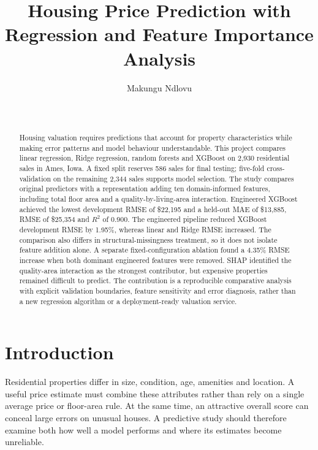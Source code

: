 \documentclass{sigkddExp}
\begin{document}
\title{Housing Price Prediction with Regression and Feature Importance Analysis}
\author{\alignauthor Makungu Ndlovu\\
\\
\\
}
\maketitle
\begin{abstract}
Housing valuation requires predictions that account for property characteristics while making error patterns and model behaviour understandable. This project compares linear regression, Ridge regression, random forests and XGBoost on 2,930 residential sales in Ames, Iowa. A fixed split reserves 586 sales for final testing; five-fold cross-validation on the remaining 2,344 sales supports model selection. The study compares original predictors with a representation adding ten domain-informed features, including total floor area and a quality-by-living-area interaction. Engineered XGBoost achieved the lowest development RMSE of \$22,195 and a held-out MAE of \$13,885, RMSE of \$25,354 and $R^2$ of 0.900. The engineered pipeline reduced XGBoost development RMSE by 1.95\%, whereas linear and Ridge RMSE increased. The comparison also differs in structural-missingness treatment, so it does not isolate feature addition alone. A separate fixed-configuration ablation found a 4.35\% RMSE increase when both dominant engineered features were removed. SHAP identified the quality-area interaction as the strongest contributor, but expensive properties remained difficult to predict. The contribution is a reproducible comparative analysis with explicit validation boundaries, feature sensitivity and error diagnosis, rather than a new regression algorithm or a deployment-ready valuation service.
\end{abstract}

\section{Introduction}
Residential properties differ in size, condition, age, amenities and location. A useful price estimate must combine these attributes rather than rely on a single average price or floor-area rule. At the same time, an attractive overall score can conceal large errors on unusual houses. A predictive study should therefore examine both how well a model performs and where its estimates become unreliable.
\end{document}
